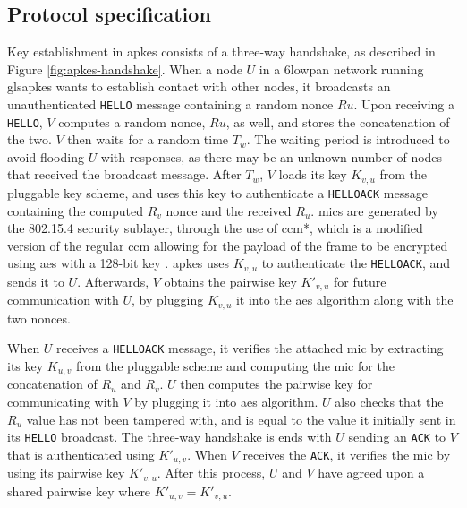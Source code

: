 

\subsection{Protocol specification}

Key establishment in \gls{apkes} consists of a three-way handshake, as described in Figure \ref{fig:apkes-handshake}. When a node $U$ in a \gls{6lowpan} network running gls{apkes} wants to establish contact with other nodes, it broadcasts an unauthenticated \texttt{HELLO} message containing a random nonce $Ru$. Upon receiving a \texttt{HELLO}, $V$ computes a random nonce, $Ru$, as well, and stores the concatenation of the two. $V$ then waits for a random time $T_w$. The waiting period is introduced to avoid flooding $U$ with responses, as there may be an unknown number of nodes that received the broadcast message. After $T_w$, $V$ loads its key $K_{v,u}$ from the pluggable key scheme, and uses this key to authenticate a \texttt{HELLOACK} message containing the computed $R_v$ nonce and the received $R_u$. \gls{mic}s are generated by the 802.15.4 security sublayer, through the use of \gls{ccm}*, which is a modified version of the regular \gls{ccm} allowing for the payload of the frame to be encrypted using \gls{aes} with a 128-bit key \cite{krentz20136lowpan}. \gls{apkes} uses $K_{v,u}$ to authenticate the \texttt{HELLOACK}, and sends it to $U$. Afterwards, $V$ obtains the pairwise key $K'_{v,u}$ for future communication with $U$, by plugging $K_{v,u}$ it into the \gls{aes} algorithm along with the two nonces.


When $U$ receives a \texttt{HELLOACK} message, it verifies the attached \gls{mic} by extracting its key $K_{u,v}$ from the pluggable scheme and computing the \gls{mic} for the concatenation of $R_u$ and $R_v$. $U$ then computes the pairwise key for communicating with $V$ by plugging it into \gls{aes} algorithm. $U$ also checks that the $R_u$ value has not been tampered with, and is equal to the value it initially sent in its \texttt{HELLO} broadcast. The three-way handshake is ends with $U$ sending an \texttt{ACK} to $V$ that is authenticated using $K'_{u,v}$. When $V$ receives the \texttt{ACK}, it verifies the \gls{mic} by using its pairwise key $K'_{v,u}$. After this process, $U$ and $V$ have agreed upon a shared pairwise key where $K'_{u,v} = K'_{v,u}$.

